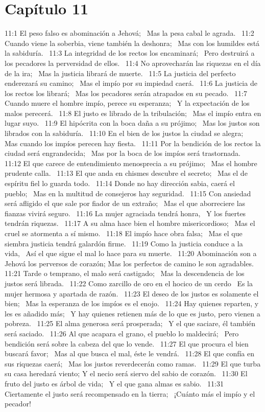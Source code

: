\section*{Capítulo 11 }

11:1 El peso falso es abominación a Jehová;  
Mas la pesa cabal le agrada.  
11:2 Cuando viene la soberbia, viene también la deshonra;  
Mas con los humildes está la sabiduría.  
11:3 La integridad de los rectos los encaminará;  
Pero destruirá a los pecadores la perversidad de ellos.  
11:4 No aprovecharán las riquezas en el día de la ira;  
Mas la justicia librará de muerte.  
11:5 La justicia del perfecto enderezará su camino;  
Mas el impío por su impiedad caerá.  
11:6 La justicia de los rectos los librará;  
Mas los pecadores serán atrapados en su pecado.  
11:7 Cuando muere el hombre impío, perece su esperanza;  
Y la expectación de los malos perecerá.  
11:8 El justo es librado de la tribulación;  
Mas el impío entra en lugar suyo.  
11:9 El hipócrita con la boca daña a su prójimo;  
Mas los justos son librados con la sabiduría.  
11:10 En el bien de los justos la ciudad se alegra;  
Mas cuando los impíos perecen hay fiesta.  
11:11 Por la bendición de los rectos la ciudad será engrandecida;  
Mas por la boca de los impíos será trastornada.  
11:12 El que carece de entendimiento menosprecia a su prójimo;  
Mas el hombre prudente calla.  
11:13 El que anda en chismes descubre el secreto;  
Mas el de espíritu fiel lo guarda todo.  
11:14 Donde no hay dirección sabia, caerá el pueblo;  
Mas en la multitud de consejeros hay seguridad.  
11:15 Con ansiedad será afligido el que sale por fiador de un extraño;  
Mas el que aborreciere las fianzas vivirá seguro.  
11:16 La mujer agraciada tendrá honra,  
Y los fuertes tendrán riquezas.  
11:17 A su alma hace bien el hombre misericordioso;  
Mas el cruel se atormenta a sí mismo.  
11:18 El impío hace obra falsa;  
Mas el que siembra justicia tendrá galardón firme.  
11:19 Como la justicia conduce a la vida,  
Así el que sigue el mal lo hace para su muerte.  
11:20 Abominación son a Jehová los perversos de corazón; 
Mas los perfectos de camino le son agradables.  
11:21 Tarde o temprano, el malo será castigado;  
Mas la descendencia de los justos será librada.  
11:22 Como zarcillo de oro en el hocico de un cerdo  
Es la mujer hermosa y apartada de razón.  
11:23 El deseo de los justos es solamente el bien;  
Mas la esperanza de los impíos es el enojo.  
11:24 Hay quienes reparten, y les es añadido más;  
Y hay quienes retienen más de lo que es justo, pero vienen a pobreza.  
11:25 El alma generosa será prosperada;  
Y el que saciare, él también será saciado.  
11:26 Al que acapara el grano, el pueblo lo maldecirá;  
Pero bendición será sobre la cabeza del que lo vende.  
11:27 El que procura el bien buscará favor;  
Mas al que busca el mal, éste le vendrá.  
11:28 El que confía en sus riquezas caerá;  
Mas los justos reverdecerán como ramas.  
11:29 El que turba su casa heredará viento; 
Y el necio será siervo del sabio de corazón.  
11:30 El fruto del justo es árbol de vida;  
Y el que gana almas es sabio.  
11:31 Ciertamente el justo será recompensado en la tierra;  
¡Cuánto más el impío y el pecador!  
